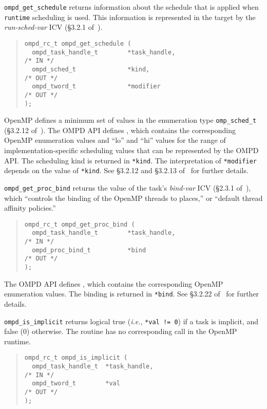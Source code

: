 %
\verb|ompd_get_schedule| returns information about the schedule that is
applied when \verb|runtime| scheduling is used.
%
This information is represented in the target by the
\emph{run-sched-var} ICV (\S3.2.1 of~\cite{OpenMP}).
%
\begin{quote}
\begin{lstlisting}
ompd_rc_t ompd_get_schedule (
  ompd_task_handle_t        *task_handle,                           /* IN */
  ompd_sched_t              *kind,                                 /* OUT */
  ompd_tword_t              *modifier                              /* OUT */
); 
\end{lstlisting}
\end{quote}
%
OpenMP defines a minimum set of values in the enumeration type
\verb|omp_sched_t| (\S3.2.12 of~\cite{OpenMP}).
%
The OMPD API defines
, which contains the
corresponding OpenMP enumeration values and ``lo'' and ``hi'' values
for the range of implementation-specific scheduling values that can be
represented by the OMPD API.
%
The scheduling kind is returned in \verb|*kind|.
%
The interpretation of \verb|*modifier| depends on the value of
\verb|*kind|.
%
See \S3.2.12 and \S3.2.13 of~\cite{OpenMP} for further details.

%
\verb|ompd_get_proc_bind| returns the value of the task's
\emph{bind-var} ICV (\S2.3.1 of~\cite{OpenMP}), which ``controls the
binding of the OpenMP threads to places,'' or ``default thread
affinity policies.''
%
\begin{quote}
\begin{lstlisting}
ompd_rc_t ompd_get_proc_bind (
  ompd_task_handle_t        *task_handle,                           /* IN */
  ompd_proc_bind_t          *bind                                  /* OUT */
); 
\end{lstlisting}
\end{quote}
The OMPD API defines
, which
contains the corresponding OpenMP enumeration values.
%
The binding is returned in \verb|*bind|.
%
See \S3.2.22 of~\cite{OpenMP} for further details.

\verb|ompd_is_implicit| returns logical true (\textit{i.e.}, \texttt{*val != 0})
if a task is implicit, and false (0) otherwise.
The routine has no corresponding call in the OpenMP runtime.
\begin{quote}
\begin{lstlisting}
ompd_rc_t ompd_is_implicit (
  ompd_task_handle_t  *task_handle,                                 /* IN */
  ompd_tword_t        *val                                         /* OUT */
); 
\end{lstlisting}
\end{quote}


